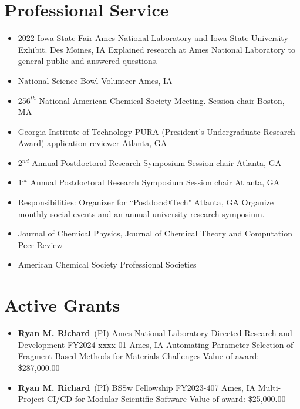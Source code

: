 \documentclass[11pt,a4paper,sans]{moderncv}
\begin{document}
\section{Professional Service}
\vspace{5pt}
\begin{itemize}
	\item{
	      {2022 Iowa State Fair}
		  {Ames National Laboratory and Iowa State University Exhibit.}
		  {Des Moines, IA}
		  {}
		  {Explained research at Ames National Laboratory to general public and
		   answered questions.}}

	\item{
          {National Science Bowl}
          {Volunteer}
          {Ames, IA}
          {}
          {}}
	\item{
          {256$^{th}$ National American Chemical Society Meeting.}
          {Session chair}
          {Boston, MA}
          {}
          {}}
	\item{
          {Georgia Institute of Technology}
          {PURA (President's Undergraduate Research Award) application reviewer}
          {Atlanta, GA}
          {}
          {}}
	\item{
         {2$^{nd}$ Annual Postdoctoral Research Symposium}
         {Session chair}
         {Atlanta, GA}
         {}
         {}}
	\item{
          {1$^{st}$ Annual Postdoctoral Research Symposium}
          {Session chair}
          {Atlanta, GA}
          {}
          {}}
	\item{
        {Responsibilities:}
        { Organizer for ``Postdocs@Tech"}
        {Atlanta, GA}
        {}
        {Organize monthly social events and an annual university research symposium.}}
	\item{\cventry{}
          {Journal of Chemical Physics, Journal of Chemical Theory and
          Computation}
          {Peer Review}
		  {}
          {}
          {}}
	\item{\cventry{}
          {American Chemical Society}
          {Professional Societies}
          {}
          {}
          {}}
\end{itemize}


\section{Active Grants}
\vspace{5pt}
\begin{itemize}
	\item{
		{\textbf{Ryan M. Richard}\ (PI)}
		{Ames National Laboratory Directed Research and Development
         FY2024-xxxx-01}
		{Ames, IA}
		{}
		{Automating Parameter Selection of Fragment Based Methods for Materials
		Challenges}
		{Value of award: \$287,000.00}
		{}
	}
	\item{
		{\textbf{Ryan M. Richard}\ (PI)}
		{BSSw Fellowship FY2023-407}
		{Ames, IA}
		{}
		{Multi-Project CI/CD for Modular Scientific Software}
		{Value of award: \$25,000.00}
		{}
	}
\end{itemize}
\end{document}
